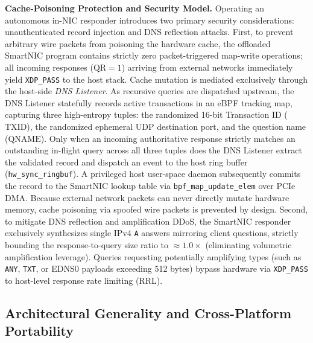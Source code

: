 \documentclass[a4paper,fleqn,colorlinks,hidelinks]{cas-sc}
\begin{document}
\textbf{Cache-Poisoning Protection and Security Model.} Operating an autonomous in-NIC responder introduces two primary security considerations: unauthenticated record injection and DNS reflection attacks. First, to prevent arbitrary wire packets from poisoning the hardware cache, the offloaded SmartNIC program contains strictly zero packet-triggered map-write operations; all incoming responses ($\text{QR}=1$) arriving from external networks immediately yield \texttt{XDP\_PASS} to the host stack. Cache mutation is mediated exclusively through the host-side \textit{DNS Listener}. As recursive queries are dispatched upstream, the DNS Listener statefully records active transactions in an eBPF tracking map, capturing three high-entropy tuples: the randomized 16-bit Transaction ID ($\text{TXID}$), the randomized ephemeral UDP destination port, and the question name ($\text{QNAME}$). Only when an incoming authoritative response strictly matches an outstanding in-flight query across all three tuples does the DNS Listener extract the validated record and dispatch an event to the host ring buffer (\texttt{hw\_sync\_ringbuf}). A privileged host user-space daemon subsequently commits the record to the SmartNIC lookup table via \texttt{bpf\_map\_update\_elem} over PCIe DMA. Because external network packets can never directly mutate hardware memory, cache poisoning via spoofed wire packets is prevented by design. Second, to mitigate DNS reflection and amplification DDoS, the SmartNIC responder exclusively synthesizes single IPv4 \texttt{A} answers mirroring client questions, strictly bounding the response-to-query size ratio to $\approx 1.0\times$ (eliminating volumetric amplification leverage). Queries requesting potentially amplifying types (such as \texttt{ANY}, \texttt{TXT}, or EDNS0 payloads exceeding 512 bytes) bypass hardware via \texttt{XDP\_PASS} to host-level response rate limiting (RRL).

\subsection{Architectural Generality and Cross-Platform Portability}
\label{sec:portability}
\end{document}
